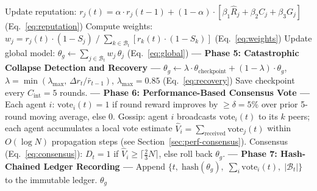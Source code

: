 \documentclass[12pt,a4paper]{article}
\begin{document}
\begin{algorithm}[htbp]
\begin{algorithmic}[1]
    \State Update reputation: $r_j(t) = \alpha\cdot r_j(t{-}1) + (1{-}\alpha)\cdot[\beta_1\hat{R}_j + \beta_2 C_j + \beta_3 G_j]$ (Eq.~\ref{eq:reputation})
  \EndFor
  \State Compute weights: $w_j = r_j(t)\cdot(1-S_j)\;/\;\sum_{k\in\mathcal{B}_t}[r_k(t)\cdot(1-S_k)]$ (Eq.~\ref{eq:weights})
  \State Update global model: $\theta_g \leftarrow \sum_{j\in\mathcal{B}_t} w_j\,\theta_j$ (Eq.~\ref{eq:global})
  \State \textbf{--- Phase 5: Catastrophic Collapse Detection and Recovery ---}
    \State $\theta_g \leftarrow \lambda\cdot\theta_{\text{checkpoint}} + (1-\lambda)\cdot\theta_g$,\; $\lambda = \min(\lambda_{\max},\,\Delta r_t / \bar{r}_{t-1})$, $\lambda_{\max}=0.85$ (Eq.~\ref{eq:recovery})
  \EndIf
  \State Save checkpoint every $C_{\text{int}} = 5$ rounds.
  \State \textbf{--- Phase 6: Performance-Based Consensus Vote ---}
  \State Each agent $i$: $\mathrm{vote}_i(t) = 1$ if round reward improves by $\geq\delta = 5\%$ over prior 5-round moving average, else 0.
  \State Gossip: agent $i$ broadcasts $\mathrm{vote}_i(t)$ to its $k$ peers; each agent accumulates a local vote estimate $\hat{V}_i = \sum_{\text{received}} \mathrm{vote}_j(t)$ within $O(\log N)$ propagation steps (see Section~\ref{sec:perf-consensus}).
  \State Consensus (Eq.~\ref{eq:consensus}): $D_t = 1$ if $\hat{V}_i \geq \lceil\tfrac{2}{3}N\rceil$, else roll back $\theta_g$.
  \State \textbf{--- Phase 7: Hash-Chained Ledger Recording ---}
    \State Append $\{t,\;\mathrm{hash}(\theta_g),\;\sum_i \mathrm{vote}_i(t),\;|\mathcal{B}_t|\}$ to the immutable ledger.
  \EndIf
\EndFor
\State \Return $\theta_g$
\end{algorithmic}
\end{algorithm}
\end{document}
